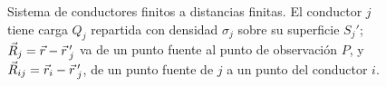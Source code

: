 \begin{figure}[t]
\caption{Sistema de conductores finitos a distancias finitas. El conductor $j$ tiene carga $Q_j$ repartida con densidad $\sigma_j$ sobre su superficie
$S_j'$; $\vec{R}_j=\vec{r}-\vec{r}\,'_j$ va de un punto fuente al punto de observación $P$, y $\vec{R}_{ij}=\vec{r}_i-\vec{r}\,'_j$, de un punto fuente de $j$ a un punto del
conductor $i$.}
\label{fig:sistema-geom}
\end{figure}
